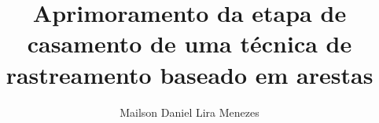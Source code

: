 \documentclass[12pt]{article}
\title{Aprimoramento da etapa de casamento de uma técnica de rastreamento baseado em arestas}
\author{Mailson Daniel Lira Menezes\inst{1}}
\begin{document}
\maketitle





\nocite{*}


\end{document}
